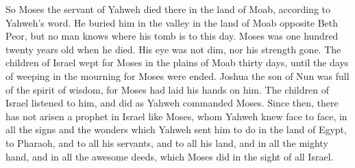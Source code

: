  So Moses the servant of Yahweh died there in the land of
Moab, according to Yahweh's word.  He buried him in the
valley in the land of Moab opposite Beth Peor, but no man knows where
his tomb is to this day.  Moses was one hundred twenty years
old when he died. His eye was not dim, nor his strength gone.
 The children of Israel wept for Moses in the plains of Moab
thirty days, until the days of weeping in the mourning for Moses were
ended.  Joshua the son of Nun was full of the spirit of
wisdom, for Moses had laid his hands on him. The children of Israel
listened to him, and did as Yahweh commanded Moses.  Since
then, there has not arisen a prophet in Israel like Moses, whom Yahweh
knew face to face,  in all the signs and the wonders which
Yahweh sent him to do in the land of Egypt, to Pharaoh, and to all his
servants, and to all his land,  and in all the mighty hand,
and in all the awesome deeds, which Moses did in the sight of all
Israel.
